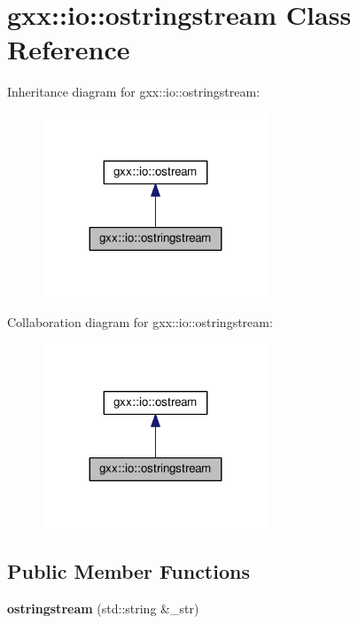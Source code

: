 \hypertarget{classgxx_1_1io_1_1ostringstream}{}\section{gxx\+:\+:io\+:\+:ostringstream Class Reference}
\label{classgxx_1_1io_1_1ostringstream}


Inheritance diagram for gxx\+:\+:io\+:\+:ostringstream\+:
\nopagebreak
\begin{figure}[H]
\begin{center}
\leavevmode
\includegraphics[width=191pt]{classgxx_1_1io_1_1ostringstream__inherit__graph}
\end{center}
\end{figure}


Collaboration diagram for gxx\+:\+:io\+:\+:ostringstream\+:
\nopagebreak
\begin{figure}[H]
\begin{center}
\leavevmode
\includegraphics[width=191pt]{classgxx_1_1io_1_1ostringstream__coll__graph}
\end{center}
\end{figure}
\subsection*{Public Member Functions}
\begin{DoxyCompactItemize}
\item 
{\bfseries ostringstream} (std\+::string \&\+\_\+str)\hypertarget{classgxx_1_1io_1_1ostringstream_af7608368f8b0bd4866a541b80c2b46aa}{}\label{classgxx_1_1io_1_1ostringstream_af7608368f8b0bd4866a541b80c2b46aa}

\end{DoxyCompactItemize}
